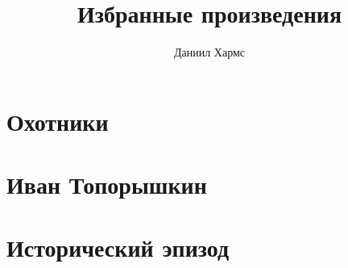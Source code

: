 \documentclass[12pt, a4paper]{article}
\title{Избранные произведения}
\author{Даниил Хармс}
\date{}
\begin{document}
\maketitle

\section*{Охотники}


\section*{Иван Топорышкин}


\section*{Исторический эпизод}

\end{document}
